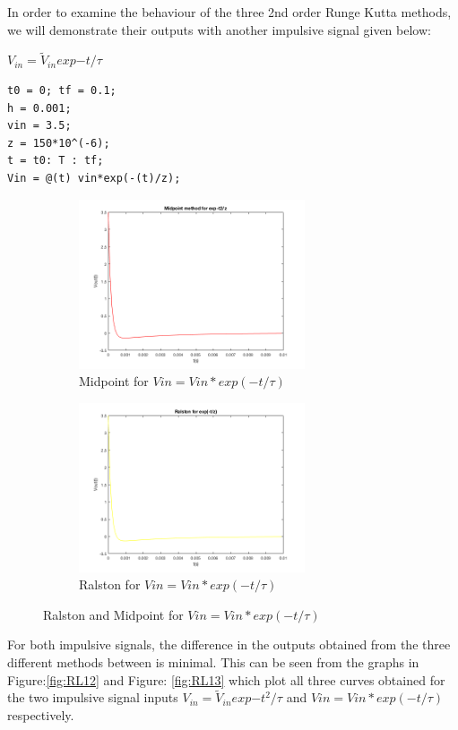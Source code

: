 \documentclass[11pt,a4paper]{article}
\begin{document}
In order to examine the behaviour of the three 2nd order Runge Kutta methods, we will demonstrate their outputs with another impulsive signal given below:


$V_{in} = \tilde{V}_{in}  exp{-t/\tau}$

\begin{verbatim}
t0 = 0; tf = 0.1;
h = 0.001;
vin = 3.5;
z = 150*10^(-6);
t = t0: T : tf;
Vin = @(t) vin*exp(-(t)/z);
\end{verbatim}

\begin{figure}[h]
\begin{subfigure}{.5\textwidth}
  \includegraphics[width=.9\linewidth,height = 5cm]{Ex1_Figs/mid_t.png}
  \caption[right]{Midpoint for $Vin = Vin*exp(-t/\tau)$}
  \label{fig:RL10}
\end{subfigure}
\begin{subfigure}{.5\textwidth}
  \includegraphics[width=.9\linewidth,height = 5cm]{Ex1_Figs/rals_t.png}
  \caption{Ralston for $Vin = Vin*exp(-t/\tau)$}
  \label{fig:RL11}
\end{subfigure}
\caption{Ralston and Midpoint for $Vin = Vin*exp(-t/\tau)$}
\label{fig:RLy}
\end{figure}


For both impulsive signals, the difference in the outputs obtained from the three different methods between  is minimal. This can be seen from the graphs in Figure:\ref{fig:RL12} and Figure: \ref{fig:RL13} which plot all three curves obtained for the two impulsive signal inputs $V_{in} = \tilde{V}_{in}  exp{-t^2/\tau}$ and $Vin = Vin*exp(-t/\tau)$ respectively.
\end{document}
